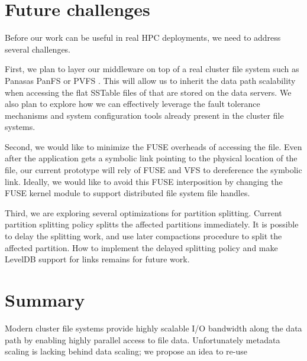 \section{Future challenges}
\label{futurework}

Before our work can be useful in real HPC deployments, we need to address
several challenges.

First, we plan to layer our middleware on top of a real cluster file system
such as Panasas PanFS \citep{panfs:welch08} or PVFS \citep{pvfs:www}. This will
allow us to inherit the data path scalability when accessing the flat SSTable
files of \ldb that are stored on the data servers. We also plan to explore how
we can effectively leverage the fault tolerance mechanisms and system
configuration tools already present in the cluster file systems.

Second, we would like to minimize the FUSE overheads of accessing the file.
Even after the application gets a symbolic link pointing to the physical
location of the file, our current prototype will rely of FUSE and VFS to
dereference the symbolic link. Ideally, we would like to avoid this FUSE
interposition by changing the FUSE kernel module to support distributed file
system file handles. 

Third, we are exploring several optimizations for partition splitting.
Current partition splitting policy splitts the affected partitions immediately.
It is possible to delay the splitting work, and use later compactions procedure
to split the affected partition. How to implement the delayed splitting policy
and make LevelDB support for links remains for future work. 

\section{Summary}
\label{summary}

Modern cluster file systems provide highly scalable I/O bandwidth along the
data path by enabling highly parallel access to file data.
Unfortunately metadata scaling is lacking behind data scaling; we propose an
idea to re-use 




